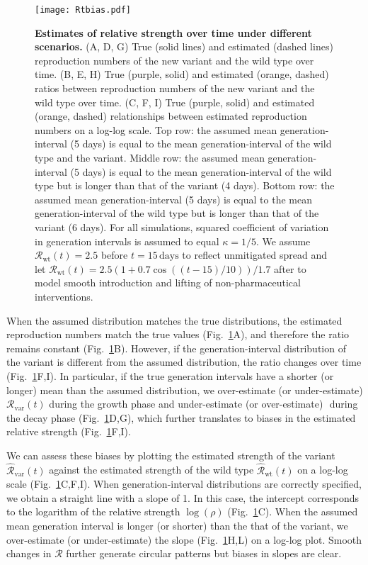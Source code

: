 \documentclass[12pt]{article}
\newcommand{\fref}[1]{Fig.~\ref{fig:#1}}
\newcommand{\Rx}[1]{\ensuremath{{\mathcal R}_{#1}}\xspace}
\newcommand{\Ry}[1]{\Rx{\mathrm{#1}}}
\newcommand{\RR}{\ensuremath{{\mathcal R}}\xspace}
\begin{document}
\begin{figure}[!th]
\texttt{[image: Rtbias.pdf]}
\caption{
\textbf{Estimates of relative strength over time under different scenarios.}
(A, D, G) True (solid lines) and estimated (dashed lines) reproduction numbers of the new variant and the wild type over time.
(B, E, H) True (purple, solid) and estimated (orange, dashed) ratios between reproduction numbers of the new variant and the wild type over time.
(C, F, I) True (purple, solid) and estimated (orange, dashed) relationships between estimated reproduction numbers on a log-log scale.
Top row: the assumed mean generation-interval (5 days) is equal to the mean generation-interval of the wild type and the variant.
Middle row: the assumed mean generation-interval (5 days) is equal to the mean generation-interval of the wild type but is longer than that of the variant (4 days).
Bottom row: the assumed mean generation-interval (5 days) is equal to the mean generation-interval of the wild type but is longer than that of the variant (6 days).
For all simulations, squared coefficient of variation in generation intervals is assumed to equal $\kappa = 1/5$.
We assume $\Ry{wt}(t)=2.5$ before $t=15\,\textrm{days}$ to reflect unmitigated spread and let $\Ry{wt}(t)=2.5 (1+0.7\cos((t-15)/10))/1.7$ after to model smooth introduction and lifting of non-pharmaceutical interventions.
}
\label{fig:Rtbias}
\end{figure}

When the assumed distribution matches the true distributions, the estimated reproduction numbers match the true values (\fref{Rtbias}A), and therefore the ratio remains constant (\fref{Rtbias}B).
However, if the generation-interval distribution of the variant is different from the assumed distribution, the ratio changes over time (\fref{Rtbias}F,I).
In particular, if the true generation intervals have a shorter (or longer) mean than the assumed distribution, we over-estimate (or under-estimate) $\Ry{var}(t)$ during the growth phase and under-estimate (or over-estimate) $ $ during the decay phase (\fref{Rtbias}D,G), which further translates to biases in the estimated relative strength (\fref{Rtbias}F,I).

We can assess these biases by plotting the estimated strength of the variant $\hat{\RR}_{\textrm{var}}(t)$ against the estimated strength of the wild type $\hat{\RR}_{\textrm{wt}}(t)$ on a log-log scale (\fref{Rtbias}C,F,I).
When generation-interval distributions are correctly specified, we obtain a straight line with a slope of 1. 
In this case, the intercept corresponds to the logarithm of the relative strength $\log(\rho)$ (\fref{Rtbias}C).
When the assumed mean generation interval is longer (or shorter) than the that of the variant, we over-estimate (or under-estimate) the slope (\fref{Rtbias}H,L) on a log-log plot.
Smooth changes in $\RR$ further generate circular patterns but biases in slopes are clear.
\end{document}
